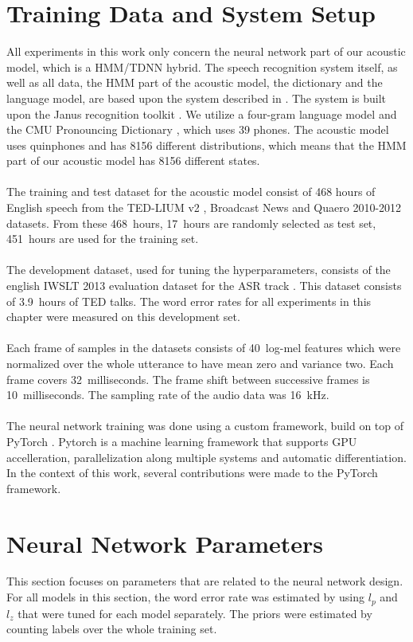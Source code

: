 \section{Training Data and System Setup}
All experiments in this work only concern the neural network part of our acoustic model, which is a HMM/TDNN hybrid. The speech recognition system itself, as well as all data, the HMM part of the acoustic model, the dictionary and the language model, are based upon the system described in \cite{nguyen20162016}. The system is built upon the Janus recognition toolkit \cite{finke1997karlsruhe}. We utilize a four-gram language model and the CMU Pronouncing Dictionary \cite{cmudict}, which uses 39 phones. The acoustic model uses quinphones and has 8156 different distributions, which means that the HMM part of our acoustic model has 8156 different states. \\ \\
The training and test dataset for the acoustic model consist of 468 hours of English speech from the TED-LIUM v2 \cite{rousseau2014enhancing}, Broadcast News \cite{graff19971996} and Quaero 2010-2012 datasets. From these 468~hours, 17~hours are randomly selected as test set, 451~hours are used for the training set. \\ \\
The development dataset, used for tuning the hyperparameters, consists of the english IWSLT 2013 evaluation dataset for the ASR track \cite{cettolo2013report}. This dataset consists of 3.9~hours of TED talks. The word error rates for all experiments in this chapter were measured on this development set. \\ \\ 
Each frame of samples in the datasets consists of 40~log-mel features which were normalized over the whole utterance to have mean zero and variance two. Each frame covers 32~milliseconds. The frame shift between successive frames is 10~milliseconds. The sampling rate of the audio data was 16~kHz. \\ \\
The neural network training was done using a custom framework, build on top of PyTorch \cite{paszke2017automatic}. Pytorch is a machine learning framework that supports GPU accelleration, parallelization along multiple systems and automatic differentiation. In the context of this work, several contributions were made to the PyTorch framework.  
\section{Neural Network Parameters}
This section focuses on parameters that are related to the neural network design. For all models in this section, the word error rate was estimated by using $l_p$ and $l_z$ that were tuned for each model separately. The priors were estimated by counting labels over the whole training set.
